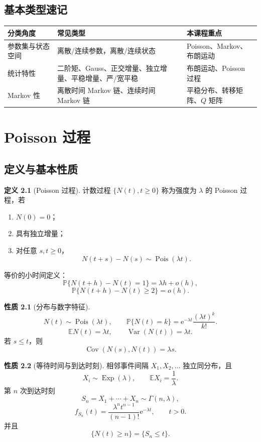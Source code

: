 \documentclass[12pt,a4paper,openany]{ctexrep}
\theoremstyle{definition}
\newtheorem{definition}{定义}[section]
\newtheorem{property}{性质}[section]
\newcommand{\E}{\mathbb{E}}
\newcommand{\Var}{\operatorname{Var}}
\newcommand{\Cov}{\operatorname{Cov}}
\newcommand{\Pp}{\mathbb{P}}
\newcommand{\Pois}{\operatorname{Pois}}
\newcommand{\Exp}{\operatorname{Exp}}
\newcommand{\e}{\mathrm{e}}
\begin{document}
\section{基本类型速记}

\begin{center}
\begin{tabular}{p{3.1cm}p{5.4cm}p{5.2cm}}
\toprule
分类角度 & 常见类型 & 本课程重点 \\
\midrule
参数集与状态空间 & 离散/连续参数，离散/连续状态 & Poisson、Markov、布朗运动 \\
统计特性 & 二阶矩、Gauss、正交增量、独立增量、平稳增量、严/宽平稳 & 布朗运动、Poisson 过程 \\
Markov 性 & 离散时间 Markov 链、连续时间 Markov 链 & 平稳分布、转移矩阵、$Q$ 矩阵 \\
\bottomrule
\end{tabular}
\end{center}

\chapter{Poisson 过程}

\section{定义与基本性质}

\begin{definition}[Poisson 过程]
计数过程 $\{N(t),t\ge0\}$ 称为强度为 $\lambda$ 的 Poisson 过程，若
\begin{enumerate}[label=(\arabic*)]
	\item $N(0)=0$；
	\item 具有独立增量；
	\item 对任意 $s,t\ge0$，
	\[
	N(t+s)-N(s)\sim \Pois(\lambda t).
	\]
\end{enumerate}
\end{definition}

等价的小时间定义：
\[
\Pp\{N(t+h)-N(t)=1\}=\lambda h+o(h),
\]
\[
\Pp\{N(t+h)-N(t)\ge2\}=o(h).
\]

\begin{property}[分布与数字特征]
\[
N(t)\sim\Pois(\lambda t),\qquad
\Pp\{N(t)=k\}=\e^{-\lambda t}\frac{(\lambda t)^k}{k!}.
\]
\[
\E N(t)=\lambda t,\qquad \Var(N(t))=\lambda t.
\]
若 $s\le t$，则
\[
\Cov(N(s),N(t))=\lambda s.
\]
\end{property}

\begin{property}[等待时间与到达时刻]
相邻事件间隔 $X_1,X_2,\dots$ 独立同分布，且
\[
X_i\sim \Exp(\lambda),\qquad \E X_i=\frac1\lambda.
\]
第 $n$ 次到达时刻
\[
S_n=X_1+\cdots+X_n\sim \Gamma(n,\lambda),
\]
\[
f_{S_n}(t)=\frac{\lambda^n t^{n-1}}{(n-1)!}\e^{-\lambda t},\qquad t>0.
\]
并且
\[
\{N(t)\ge n\}=\{S_n\le t\}.
\]
\end{property}
\end{document}
